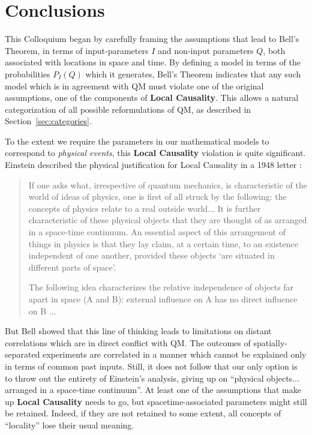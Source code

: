 \documentclass[onecolumn, nofootinbib, 12pt]{revtex4-1}
\begin{document}
\section{Conclusions}

This Colloquium began by carefully framing the assumptions that lead to Bell's Theorem, in terms of input-parameters $I$ and non-input parameters $Q$, both associated with locations in space and time.  By defining a model in terms of the probabilities $P_I(Q)$ which it generates, Bell's Theorem indicates that any such model which is in agreement with QM must violate one of the original assumptions, one of the components of {\bf Local Causality}.  This allows a natural categorization of all possible reformulations of QM, as described in Section~\ref{sec:categories}.  

To the extent we require the parameters in our mathematical models to correspond to \emph{physical events}, this {\bf Local Causality} violation is quite significant.  Einstein described the physical justification for Local Causality in a 1948 letter \cite{born1971}:
\begin{quote}
If one asks what, irrespective of quantum mechanics, is characteristic of the world of ideas of physics, one is first of all struck by the following: the concepts of physics relate to a real outside world...  It is further characteristic of these physical objects that they are thought of as arranged in a space-time continuum. An essential aspect of this arrangement of things in physics is that they lay claim, at a certain time, to an existence independent of one another, provided these objects `are situated in different parts of space'.

The following idea characterizes the relative independence of objects far apart in space (A and B): external influence on A has no direct influence on B ...
\end{quote}

But Bell showed that this line of thinking leads to limitations on distant correlations which are in direct conflict with QM\@.  The outcomes of spatially-separated experiments are correlated in a manner which cannot be explained only in terms of common past inputs.  Still, it does not follow that our only option is to throw out the entirety of Einstein's analysis, giving up on ``physical objects... arranged in a space-time continuum''.  At least one of the assumptions that make up {\bf Local Causality} needs to go, but spacetime-associated parameters might still be retained.  Indeed, if they are not retained to some extent, all concepts of ``locality'' lose their usual meaning.
\end{document}
